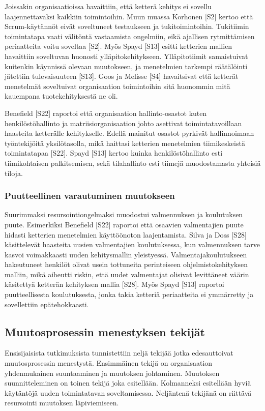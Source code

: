Joissakin organisaatioissa havaittiin, että ketterä kehitys ei sovellu
laajennettavaksi kaikkiin toimintoihin. Muun muassa Korhonen [S2] kertoo että
Scrum-käytännöt eivät soveltuneet testaukseen ja tukitoimintoihin. Tukitiimin
toimintatapa vaati välitöntä vastaamista ongelmiin, eikä ajallisen rytmittämisen
periaatteita voitu soveltaa [S2]. Myös Spayd [S13] esitti ketterien mallien
havaittiin soveltuvan huonosti ylläpitokehitykseen. Ylläpitotiimit samaistuivat
kuitenkin käynnissä olevaan muutokseen, ja menetelmien tarkempi räätälöinti
jätettiin tulevaisuuteen [S13]. Goos ja Melisse [S4] havaitsivat että ketterät
menetelmät soveltuivat organisaation toimintoihin sitä huonommin mitä kauempana
tuotekehityksestä ne oli.

Benefield [S22] raportoi että organisaation hallinto-osastot kuten
henkilöstöhallinto ja matriisiorganisaation johto asettivat toimintatavoillaan
haasteita ketterälle kehitykselle. Edellä mainitut osastot pyrkivät
hallinnoimaan työntekijöitä yksilötasolla, mikä haittasi ketterien menetelmien
tiimikeskeistä toimintatapaa [S22]. Spayd [S13] kertoo kuinka henkilöstöhallinto
esti tiimikohtaisen palkitsemisen, sekä tilahallinto esti tiimejä muodostamasta
yhteisiä tiloja.

\subsubsection{Puutteellinen varautuminen muutokseen}

Suurimmaksi resursointiongelmaksi muodostui valmennuksen ja koulutuksen puute.
Esimerkiksi Benefield [S22] raportoi että osaavien valmentajien puute hidasti
ketterien menetelmien käyttöönoton laajentamista. Silva ja Doss [S28]
käsittelevät haasteita uusien valmentajien koulutuksessa, kun valmennuksen tarve
kasvoi voimakkaasti uuden kehitysmallin yleistyessä. Valmentajakoulutukseen
hakeutuneet henkilöt olivat usein tottuneita perinteiseen ohjelmistokehityksen
malliin, mikä aiheutti riskin, että uudet valmentajat olisivat levittäneet
väärin käsitettyä ketterän kehityksen mallia [S28]. Myös Spayd [S13] raportoi
puutteellisesta koulutuksesta, jonka takia ketteriä periaatteita ei ymmärretty
ja sovellettiin epätehokkaasti.

\subsection{Muutosprosessin menestyksen tekijät}

Ensisijaisista tutkimuksista tunnistettiin neljä tekijää jotka edesauttoivat
muutosprosessin menestystä. Ensimmäinen tekijä on organisaation yhdenmukainen
suuntaaminen ja muutoksen johtaminen. Muutoksen suunnitteleminen on toinen
tekijä joka esitellään. Kolmanneksi esitellään hyviä käytäntöjä uuden
toimintatavan soveltamisessa. Neljäntenä tekijänä on riittävä resursointi
muutoksen läpiviemiseen.

